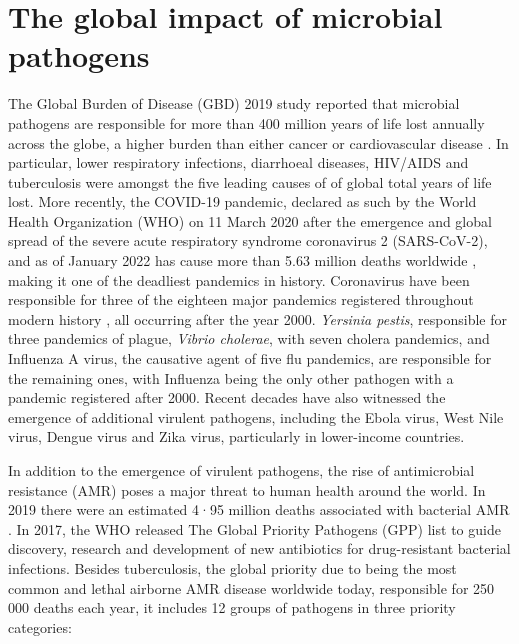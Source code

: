 \section{The global impact of microbial pathogens}

The Global Burden of Disease (GBD) 2019 study reported that microbial pathogens are responsible for more than 400 million years of life lost annually across the globe, a higher burden than either cancer or cardiovascular disease \citep{vos_global_2020}. In particular, lower respiratory infections, diarrhoeal diseases, HIV/AIDS and tuberculosis were amongst the five leading causes of of global total years of life lost. More recently, the COVID-19 pandemic, declared as such by the World Health Organization (WHO) on 11 March 2020 after the emergence and global spread of the severe acute respiratory syndrome coronavirus 2 (SARS-CoV-2), and as of January 2022 has cause more than 5.63 million deaths worldwide \citep{ritchie_coronavirus_2020}, making it one of the deadliest pandemics in history. Coronavirus have been responsible for three of the eighteen major pandemics registered throughout modern history \citep{piret_pandemics_2021}, all occurring after the year 2000. \textit{Yersinia pestis}, responsible for three pandemics of plague, \textit{Vibrio cholerae}, with seven cholera pandemics, and Influenza A virus, the causative agent of five flu pandemics, are responsible for the remaining ones, with Influenza being the only other pathogen with a pandemic registered after 2000. Recent decades have also witnessed the emergence of additional virulent pathogens, including the Ebola virus, West Nile virus, Dengue virus and Zika virus, particularly in lower-income countries.

In addition to the emergence of virulent pathogens, the rise of antimicrobial resistance (AMR) poses a major threat to human health around the world. In 2019 there were an estimated 4·95 million deaths associated with bacterial AMR \citep{murray_global_2022}. In 2017, the WHO released The Global Priority Pathogens (GPP) list \citep{organization_prioritization_2017} to guide discovery, research and development of new antibiotics for drug-resistant bacterial infections. Besides tuberculosis, the global priority due to being the most common and lethal airborne AMR disease worldwide today, responsible for 250 000 deaths each year, it includes 12 groups of pathogens in three priority categories: 

